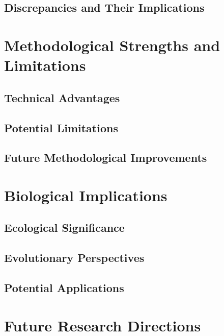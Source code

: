 \documentclass[
  11pt,
  a4paper,
]{report}
\begin{document}
\subsection{Discrepancies and Their
Implications}\label{discrepancies-and-their-implications}

\section{Methodological Strengths and
Limitations}\label{methodological-strengths-and-limitations}

\subsection{Technical Advantages}\label{technical-advantages}

\subsection{Potential Limitations}\label{potential-limitations}

\subsection{Future Methodological
Improvements}\label{future-methodological-improvements}

\section{Biological Implications}\label{biological-implications}

\subsection{Ecological Significance}\label{ecological-significance}

\subsection{Evolutionary Perspectives}\label{evolutionary-perspectives}

\subsection{Potential Applications}\label{potential-applications}

\section{Future Research Directions}\label{future-research-directions}
\end{document}
